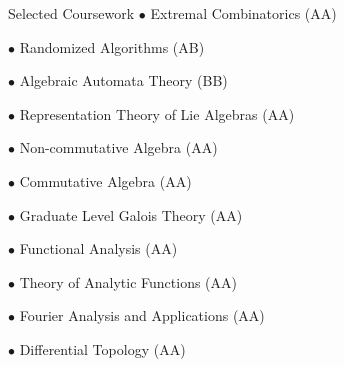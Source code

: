 \begin{rubric}{Selected Coursework}
	$\bullet$ Extremal Combinatorics (AA)

	$\bullet$ Randomized Algorithms (AB)

	$\bullet$ Algebraic Automata Theory (BB)


	\entry*[Mathematics]
	$\bullet$ Representation Theory of Lie Algebras (AA)

	$\bullet$ Non-commutative Algebra (AA)

	$\bullet$ Commutative Algebra (AA)

	$\bullet$ Graduate Level Galois Theory (AA)

	$\bullet$ Functional Analysis (AA)

	$\bullet$ Theory of Analytic Functions (AA)

	$\bullet$ Fourier Analysis and Applications (AA)

	$\bullet$ Differential Topology (AA)

\end{rubric}